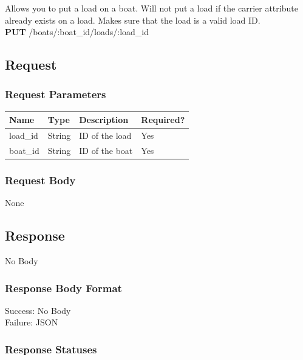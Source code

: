 \documentclass[letterpaper,11pt,titlepage,draftclsnofoot,onecolumn,compsoc,utf8,latin1]{IEEEtran}
\begin{document}
\begin{singlespace}
Allows you to put a load on a boat. Will not put a load if the carrier attribute already exists on a load. Makes sure that the load is a valid load ID. \\

\noindent \textbf{PUT} /boats/:boat\_id/loads/:load\_id

\subsection{Request}

\subsubsection{Request Parameters}

\begin{center}
    \begin{tabular}{ | p{} | p{} | p{} | p{} |}
    \hline
        \textbf{Name} & \textbf{Type} & \textbf{Description} &\textbf{Required?}  \\ \hline
        load\_id & String & ID of the load & Yes \\ \hline
        boat\_id & String & ID of the boat & Yes \\
    \hline
    \end{tabular}
\end{center}

\subsubsection{Request Body}

None

\subsection{Response}

No Body

\subsubsection{Response Body Format}
Success: No Body\\
\noindent Failure: JSON

\subsubsection{Response Statuses}


\end{singlespace}
\end{document}
